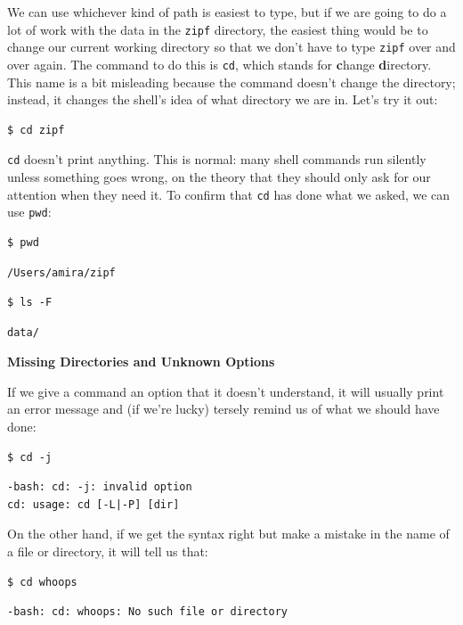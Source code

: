 \documentclass[
]{krantz}
\renewenvironment{quote}{\begin{VF}}{\end{VF}}
\begin{document}
We can use whichever kind of path is easiest to type,
but if we are going to do a lot of work with the data in the \texttt{zipf} directory,
the easiest thing would be to change our current working directory
so that we don't have to type \texttt{zipf} over and over again.
The command to do this is \texttt{cd},
which stands for \textbf{c}hange \textbf{d}irectory.
This name is a bit misleading because the command doesn't change the directory;
instead, it changes the shell's idea of what directory we are in.
Let's try it out:

\begin{verbatim}
$ cd zipf
\end{verbatim}

\texttt{cd} doesn't print anything.
This is normal:
many shell commands run silently unless something goes wrong,
on the theory that they should only ask for our attention when they need it.
To confirm that \texttt{cd} has done what we asked,
we can use \texttt{pwd}:

\begin{verbatim}
$ pwd
\end{verbatim}

\begin{verbatim}
/Users/amira/zipf
\end{verbatim}

\begin{verbatim}
$ ls -F
\end{verbatim}

\begin{verbatim}
data/
\end{verbatim}

\begin{quote}
\textbf{Missing Directories and Unknown Options}

If we give a command an option that it doesn't understand,
it will usually print an error message and (if we're lucky)
tersely remind us of what we should have done:

\begin{verbatim}
$ cd -j
\end{verbatim}

\begin{verbatim}
-bash: cd: -j: invalid option
cd: usage: cd [-L|-P] [dir]
\end{verbatim}

On the other hand,
if we get the syntax right but make a mistake in the name of a file or directory,
it will tell us that:

\begin{verbatim}
$ cd whoops
\end{verbatim}

\begin{verbatim}
-bash: cd: whoops: No such file or directory
\end{verbatim}
\end{quote}
\end{document}
